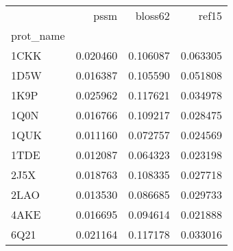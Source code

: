 \begin{tabular}{lrrr}
\toprule
{} &      pssm &   bloss62 &     ref15 \\
prot\_name &           &           &           \\
\midrule
1CKK      &  0.020460 &  0.106087 &  0.063305 \\
1D5W      &  0.016387 &  0.105590 &  0.051808 \\
1K9P      &  0.025962 &  0.117621 &  0.034978 \\
1Q0N      &  0.016766 &  0.109217 &  0.028475 \\
1QUK      &  0.011160 &  0.072757 &  0.024569 \\
1TDE      &  0.012087 &  0.064323 &  0.023198 \\
2J5X      &  0.018763 &  0.108335 &  0.027718 \\
2LAO      &  0.013530 &  0.086685 &  0.029733 \\
4AKE      &  0.016695 &  0.094614 &  0.021888 \\
6Q21      &  0.021164 &  0.117178 &  0.033016 \\
\bottomrule
\end{tabular}
